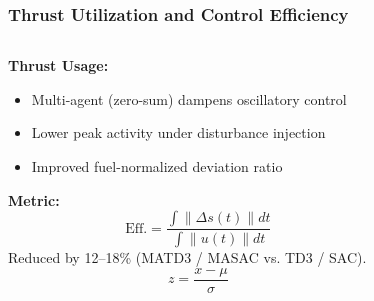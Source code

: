 \begin{frame}
  \frametitle{Thrust Utilization and Control Efficiency}
  \vspace{-0.4cm}
  \begin{columns}[T]
    \begin{column}{0.52\textwidth}
      \textbf{Thrust Usage:}
      \begin{itemize}\setlength{\itemsep}{3pt}
        \item Multi-agent (zero-sum) dampens oscillatory control
        \item Lower peak activity under disturbance injection
        \item Improved fuel-normalized deviation ratio
      \end{itemize}
      \textbf{Metric:}
      \[
        \text{Eff.} = \frac{\int \| \Delta s(t)\| dt}{\int \|u(t)\| dt}
      \]
      Reduced by 12--18\% (MATD3 / MASAC vs. TD3 / SAC).
      \[
        z = \frac{x - \mu}{\sigma}
      \]
    \end{column}
    \begin{column}{0.48\textwidth}
      \begin{figure}
        \hspace{-1.8cm}
        \centering
        \hspace{0pt}

\end{figure}
\end{column}
\end{columns}
\end{frame}
